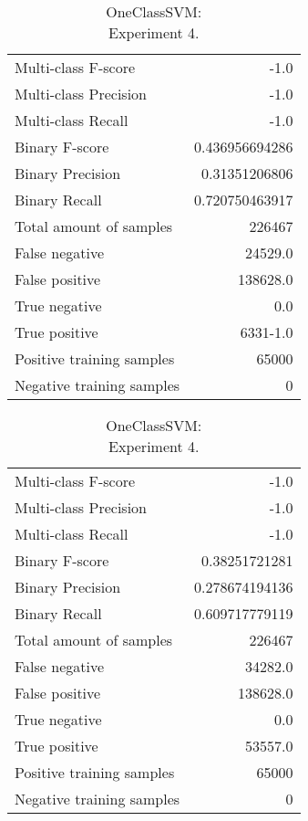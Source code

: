 \begin{table}[H]
\begin{minipage}{0.5\textwidth}
\caption{OneClassSVM: \\Experiment 3.}

\centering
\begin{tabular}{l r}
\toprule
Multi-class F-score & -1.0 \\
Multi-class Precision & -1.0 \\
Multi-class Recall & -1.0 \\
\midrule
Binary F-score & 0.436956694286 \\
Binary Precision & 0.31351206806 \\
Binary Recall & 0.720750463917 \\
\midrule
Total amount of samples & 226467 \\
False negative & 24529.0 \\
False positive & 138628.0 \\
True negative & 0.0 \\
True positive & 6331-1.0 \\
\midrule
Positive training samples & 65000 \\
Negative training samples & 0 \\
\bottomrule
\end{tabular}
\end{minipage}
\hfillx
\begin{minipage}{0.5\textwidth}

\caption{OneClassSVM: \\Experiment 4.}

\centering
\begin{tabular}{l r}
\toprule
Multi-class F-score & -1.0 \\
Multi-class Precision & -1.0 \\
Multi-class Recall & -1.0 \\
\midrule
Binary F-score & 0.38251721281 \\
Binary Precision & 0.278674194136 \\
Binary Recall & 0.609717779119 \\
\midrule
Total amount of samples & 226467 \\
False negative & 34282.0 \\
False positive & 138628.0 \\
True negative & 0.0 \\
True positive & 53557.0 \\
\midrule
Positive training samples & 65000 \\
Negative training samples & 0 \\
\bottomrule
\end{tabular}
\end{minipage}
\end{table}

